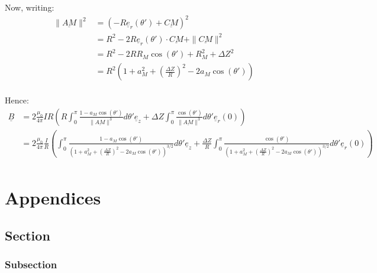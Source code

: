 \documentclass[a4paper,11pt,twoside,titlepage,openright]{book}
\numberwithin{equation}{section}
\newcommand{\ud}[1]{\underline{#1}}
\begin{document}
Now, writing:
$$
\begin{array}{ll}
    \|\ud{AM}\|^2
    & = \left(-R\ud{e}_r(\theta') + \ud{CM}\right)^2\\
    & = R^2 - 2R\ud{e}_r(\theta')\cdot\ud{CM} + \|\ud{CM}\|^2\\
    & = R^2 - 2RR_M\cos(\theta') + R_M^2 + \Delta Z^2\\
    & = R^2\left(1 + a_M^2 + \left(\frac{\Delta Z}{R}\right)^2
    - 2a_M\cos(\theta')\right)\\
\end{array}
$$

Hence:
$$
\begin{array}{ll}
    \ud{B}
    & = 2\frac{\mu_0}{4\pi}IR\left(
    R\int_{0}^{\pi}\frac{1-a_M\cos(\theta')}{\| \ud{AM} \|^3}d\theta'\ud{e}_z
    + \Delta Z\int_{0}^{\pi}\frac{\cos(\theta')}{\| \ud{AM} \|^3}d\theta'\ud{e}_r(0)
    \right)\\
    & = 2\frac{\mu_0}{4\pi}\frac{I}{R}\left(
    \int_{0}^{\pi}\frac{1-a_M\cos(\theta')}
    {\left(1 + a_M^2 + \left(\frac{\Delta Z}{R}\right)^2
    - 2a_M\cos(\theta')\right)^{3/2}}
    d\theta'\ud{e}_z
    + \frac{\Delta Z}{R}\int_{0}^{\pi}\frac{\cos(\theta')}
    {\left(1 + a_M^2 + \left(\frac{\Delta Z}{R}\right)^2
    - 2a_M\cos(\theta')\right)^{3/2}}
    d\theta'\ud{e}_r(0)
    \right)\\
\end{array}
$$



\appendix
\chapter{Appendices}

\section{Section}
\subsection{Subsection}
\end{document}

